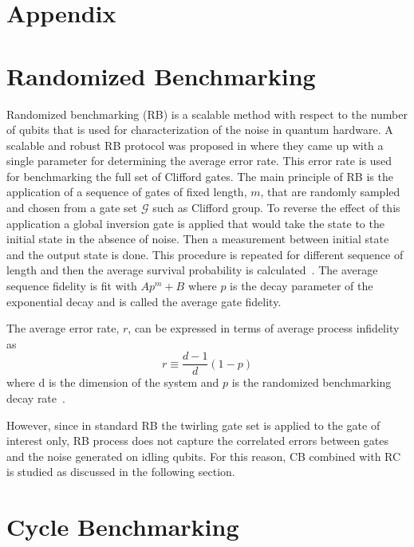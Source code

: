 \section{Appendix}
\label{sec:appendix}
\begin{appendix}
\section{Randomized  Benchmarking}
\label{sec:rand_bench}
Randomized benchmarking (RB) is a scalable method with respect to the number of qubits that is used for characterization of the noise in quantum hardware. A scalable and robust RB protocol was proposed in \cite{Magesan2010}
where they came up with a single parameter for determining the average error rate. This error rate is used for benchmarking the full set of Clifford gates.  
The main principle of RB is the application of a sequence of gates of fixed length, $m$, that are randomly sampled and chosen from a gate set $\mathcal{G}$ such as Clifford group. To reverse the effect of this application a global inversion gate is applied that would take the state to the initial state in the absence of noise. Then a measurement between initial state and the output state is done. This procedure is repeated for different sequence of length and then the average survival probability is calculated~\cite{Helsen2019}. The average sequence fidelity is fit with $A p^m+B$ where $p$ is the decay parameter of the exponential decay and is called the average gate fidelity.

The average error rate, $r$, can be expressed in terms of average process infidelity as
\begin{equation}
    r\equiv \frac{d-1}{d}(1-p) 
\end{equation}
where d is the dimension of the system and $p$ is the randomized benchmarking decay rate~\cite{Qi2019}. 


However, since in standard RB the twirling gate set is applied to the gate of interest only, RB process does not capture the correlated errors between gates and the noise generated on idling qubits. For this reason, CB combined with RC is studied as discussed in the following section. 

\section{Cycle Benchmarking}
\label{sec:cyclebenchmarking}




\end{appendix}
